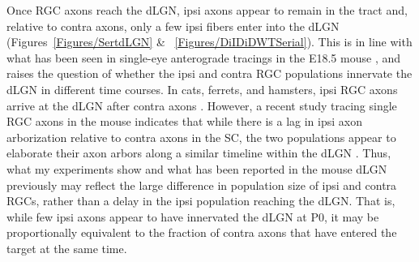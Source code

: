 Once RGC axons reach the dLGN, ipsi axons appear to remain in the tract and, relative to contra axons, only a few ipsi fibers enter into the dLGN (Figures~\ref{Figures/SertdLGN} \& ~\ref{Figures/DiIDiDWTSerial}).
This is in line with what has been seen in single-eye anterograde tracings in the E18.5 mouse \cite{godement1987study}, and raises the question of whether the ipsi and contra RGC populations innervate the dLGN in different time courses.
In cats, ferrets, and hamsters, ipsi RGC axons arrive at the dLGN after contra axons \cite{frost1979postnatal,linden1981dorsal,shatz1983prenatal}.
However, a recent study tracing single RGC axons in the mouse indicates that while there is a lag in ipsi axon arborization relative to contra axons in the SC, the two populations appear to elaborate their axon arbors along a similar timeline within the dLGN \cite{dhande2011development}.
Thus, what my experiments show and what has been reported in the mouse dLGN previously \cite{godement1987study} may reflect the large difference in population size of ipsi and contra RGCs, rather than a delay in the ipsi population reaching the dLGN.
That is, while few ipsi axons appear to have innervated the dLGN at P0, it may be proportionally equivalent to the fraction of contra axons that have entered the target at the same time.
